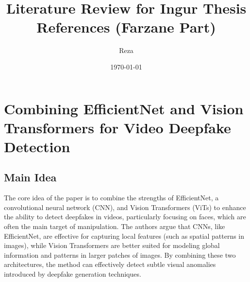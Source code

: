 \documentclass{report}
\title{Literature Review for Ingur Thesis References (Farzane Part)}
\author{Reza}
\date{\today}
\begin{document}
	
	\maketitle
	\tableofcontents
		
	 
	 
	 \chapter{Combining EfficientNet and Vision Transformers for Video Deepfake Detection \cite{DBLP:journals/corr/abs-2107-02612}}
	 
	 \section{Main Idea}
	 The core idea of the paper is to combine the strengths of EfficientNet, a convolutional neural network (CNN), and Vision Transformers (ViTs) to enhance the ability to detect deepfakes in videos, particularly focusing on faces, which are often the main target of manipulation. The authors argue that CNNs, like EfficientNet, are effective for capturing local features (such as spatial patterns in images), while Vision Transformers are better suited for modeling global information and patterns in larger patches of images. By combining these two architectures, the method can effectively detect subtle visual anomalies introduced by deepfake generation techniques.
	 
\end{document}
